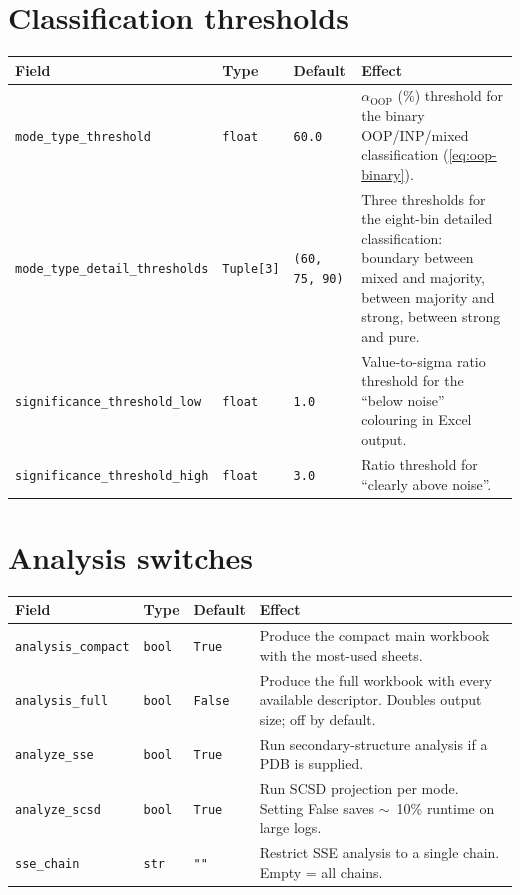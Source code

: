 \documentclass[10pt,a4paper,twoside]{article}
\newcommand{\OOP}{\mathrm{OOP}}
\newcommand{\cfgkey}[1]{\texttt{#1}}
\begin{document}
\section{Classification thresholds}

\begin{longtable}{p{} p{} p{} p{}}
\toprule
\textbf{Field} & \textbf{Type} & \textbf{Default} & \textbf{Effect} \\
\midrule
\cfgkey{mode\_type\_threshold} & \texttt{float} & \texttt{60.0}
  & $\alpha_{\OOP}$ (\%) threshold for the binary
    OOP/INP/mixed classification (\cref{eq:oop-binary}). \\
\cfgkey{mode\_type\_detail\_thresholds} & \texttt{Tuple[3]}
       & \texttt{(60, 75, 90)}
  & Three thresholds for the eight-bin detailed classification:
    boundary between mixed and majority, between majority and
    strong, between strong and pure. \\
\cfgkey{significance\_threshold\_low} & \texttt{float} & \texttt{1.0}
  & Value-to-sigma ratio threshold for the ``below noise''
    colouring in Excel output. \\
\cfgkey{significance\_threshold\_high} & \texttt{float} & \texttt{3.0}
  & Ratio threshold for ``clearly above noise''. \\
\bottomrule
\end{longtable}

\section{Analysis switches}

\begin{longtable}{p{} p{} p{} p{}}
\toprule
\textbf{Field} & \textbf{Type} & \textbf{Default} & \textbf{Effect} \\
\midrule
\cfgkey{analysis\_compact} & \texttt{bool} & \texttt{True}
  & Produce the compact main workbook with the most-used sheets. \\
\cfgkey{analysis\_full} & \texttt{bool} & \texttt{False}
  & Produce the full workbook with every available descriptor.
    Doubles output size; off by default. \\
\cfgkey{analyze\_sse} & \texttt{bool} & \texttt{True}
  & Run secondary-structure analysis if a PDB is supplied. \\
\cfgkey{analyze\_scsd} & \texttt{bool} & \texttt{True}
  & Run SCSD projection per mode. Setting False saves
    \mbox{$\sim$}~10\% runtime on large logs. \\
\cfgkey{sse\_chain} & \texttt{str} & \texttt{""}
  & Restrict SSE analysis to a single chain. Empty = all chains. \\
\bottomrule
\end{longtable}
\end{document}
